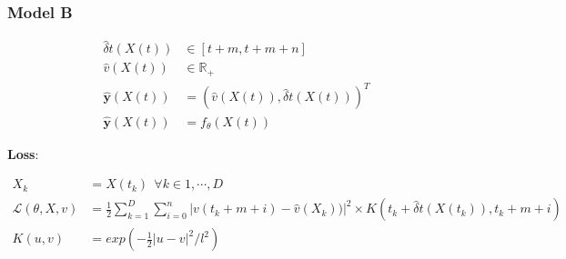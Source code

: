 \documentclass[]{article}
\theoremstyle{definition}
\begin{document}
\subsubsection*{Model B}

\begin{align*}
    \hat{\delta}t(X(t))    & \in [t+m, t+m+n] \\ 
    \hat{v}(X(t))          & \in \mathbb{R}_{+}\\
    \mathbf{\hat{y}}(X(t)) & =   (\hat{v}(X(t)), \hat{\delta}t(X(t)))^T\\
    \mathbf{\hat{y}}(X(t)) & =   f_{\theta}(X(t))
\end{align*}

\textbf{Loss}:

\begin{align*}
    X_{k}                     & = { X(t_{k}) } \ \ \forall k \in {1, \cdots, D} \\
    \mathcal{L}(\theta, X, v) & = \frac{1}{2} \sum_{k = 1}^{D}{\sum_{i = 0}^{n}{|v(t_{k}+m+i) - \hat{v}(X_k))|^{2} \times K(t_{k} + \hat{\delta}t(X(t_k)), t_{k}+m+i) }} \\
    K(u, v)                   & = exp(-\frac{1}{2}|u-v|^{2}/l^2) 
\end{align*}
\end{document}
